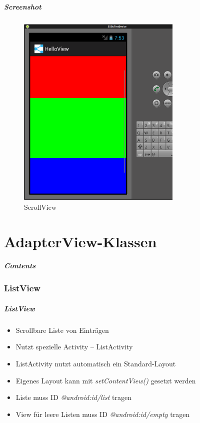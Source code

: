 \begin{frame}
   \frametitle{Screenshot}
   \begin{figure}[h!]
     \centering
     \includegraphics[width=0.7\textwidth]{pictures/scrollview.ps}
     \caption{
        ScrollView
     }
     \label{fig:scrollview}
   \end{figure}
\end{frame}

\part{AdapterView-Klassen}
\frame{\partpage}
\begin{frame}
	\frametitle{Contents}
	\tableofcontents[]
\end{frame}

\section{ListView}
\begin{frame}[label=listview]
   \frametitle{ListView}
   \begin{itemize}
      \item Scrollbare Liste von Einträgen
      \item Nutzt spezielle Activity -- ListActivity
      \item ListActivity nutzt automatisch ein Standard-Layout
      \item Eigenes Layout kann mit \emph{setContentView()} gesetzt werden
      \item Liste muss ID \emph{@android:id/list} tragen
      \item View für leere Listen muss ID \emph{@android:id/empty} tragen
   \end{itemize}
   
   
\end{frame}

